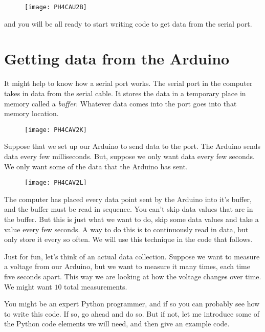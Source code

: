 \begin{figure}[h!]
	\centering
	\texttt{[image: PH4CAU2B]}
\end{figure}

and you will be all ready to start writing code to get data from the serial port.


\section{Getting data from the Arduino}

It might help to know how a serial port works. The serial port in the computer takes in data from the serial cable. It stores the data in a temporary place in memory called a \emph{buffer}. Whatever data comes into the port goes into that memory location.

\begin{figure}[h!]
	\texttt{[image: PH4CAV2K]}
\end{figure}

Suppose that we set up our Arduino to send data to the port. The Arduino sends data every few milliseconds. But, suppose we only want data every few seconds. We only want some of the data that the Arduino has sent. 

\begin{figure}[h!]
	\texttt{[image: PH4CAV2L]}
\end{figure}

The computer has placed every data point sent by the Arduino into it's buffer, and the buffer must be read in sequence. You can't skip data values that are in the buffer. But this is just what we want to do, skip some data values and take a value every few seconds. A way to do this is to continuously read in data, but only store it every so often. We will use this technique in the code that follows.

Just for fun, let's think of an actual data collection. Suppose we want to measure a voltage from our Arduino, but we want to measure it many times, each time five seconds apart. This way we are looking at how the voltage changes over time. We might want $10$ total measurements.

You might be an expert Python programmer, and if so you can probably see how to write this code. If so, go ahead and do so. But if not, let me introduce some of the Python code elements we will need, and then give an example code. 

